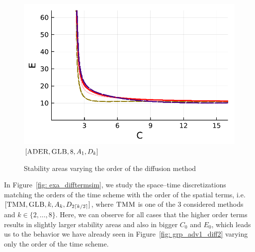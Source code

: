 \begin{figure}[!h]
	\begin{minipage}[t]{0.32\textwidth}
		\includegraphics[width=\textwidth]{pdf/pdepics/diff/IMEXADER_gaussLobatto_diff_ord_2468.pdf}
		\centering
		$[\textsc{ADER},\textsc{GLB}, 8, A_1,D_k]$
	\end{minipage}
	\caption{Stability areas varying the order of the diffusion method}
	\label{fig: exa_diffterm}
\end{figure}
In Figure~\ref{fig: exa_difftermsim}, we study the space--time discretizations matching the orders of the time scheme with the order of the spatial terms, i.e.  $[\textsc{TMM},\textsc{GLB}, k, A_k,D_{2\lceil k/2 \rceil}]$, where $\textsc{TMM}$ is one of the 3 considered methods and $k \in \{2, \hdots, 8\}$.
Here, we can observe for all cases that the higher order terms results in slightly larger stability areas and also in bigger $C_0$ and $E_0$, which leads us to the behavior we have already seen in Figure~\ref{fig: grp_adv1_diff2} varying only the order of the time scheme. 

